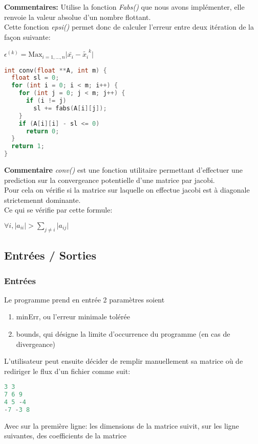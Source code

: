 \textbf{Commentaires:} Utilise la fonction \textit{Fabs()} que nous avons implémenter, elle renvoie la valeur absolue d'un nombre flottant.\\
Cette fonction \textit{epsi()} permet donc de calculer l'erreur entre deux itération de la façon suivante: \\
\begin{center}
$\epsilon^{(k)} = \text{Max}_{i=1,\ldots, n} \vert \bar{x_i} -\tilde{x_i}^k \vert $ \\
\end{center}
\begin{lstlisting}[language=C,inputencoding=utf8, basicstyle=\fontsize{8}{10}\selectfont,caption=conv() function in "source.h"]
int conv(float **A, int m) {
  float sl = 0;
  for (int i = 0; i < m; i++) {
    for (int j = 0; j < m; j++) {
      if (i != j)
        sl += fabs(A[i][j]);
    }
    if (A[i][i] - sl <= 0)
      return 0;
  }
  return 1;
}
\end{lstlisting}
\textbf{Commentaire} \textit{conv()} est une fonction utilitaire permettant d'effectuer une prediction sur la convergeance potentielle d'une matrice par jacobi.\\
Pour cela on vérifie si la matrice sur laquelle on effectue jacobi est à diagonale strictemennt dominante. \\
Ce qui se vérifie par cette formule: \\
\begin{center}
$\forall i, \vert a_{ii} \vert > \sum \limits_{j\neq i} \vert a_{ij} \vert$
\end{center}
\subsection{Entrées / Sorties}
\subsubsection{Entrées}
Le programme prend en entrée 2 paramètres soient 
\begin{enumerate}
\item minErr, ou l'erreur minimale tolérée
\item bounds, qui désigne la limite d'occurrence du programme (en cas de divergeance)
\end{enumerate}
L'utilisateur peut ensuite décider de remplir manuellement sa matrice où de rediriger le flux d'un fichier comme suit:
\begin{lstlisting}[language=C,inputencoding=utf8, basicstyle=\fontsize{8}{10}\selectfont,caption=A4.txt]
3 3
7 6 9
4 5 -4
-7 -3 8 
\end{lstlisting}
Avec sur la première ligne: les dimensions de la matrice suivit, sur les ligne suivantes, des coefficients de la matrice
